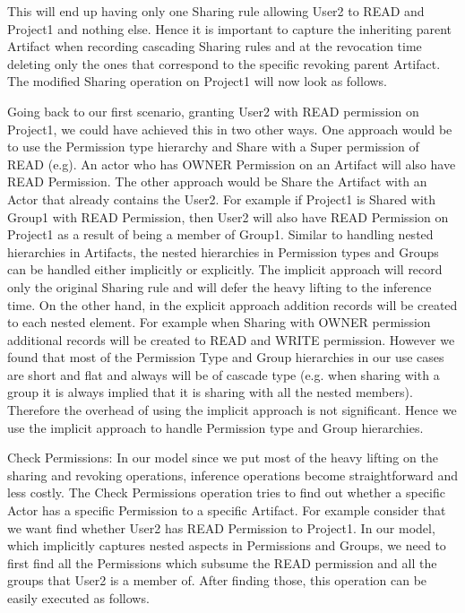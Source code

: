 \documentclass[sigconf]{acmart}
\begin{document}
This will end up having only one Sharing rule allowing User2 to READ and Project1 and nothing else. Hence it is important to capture the inheriting parent Artifact when recording cascading Sharing rules and at the revocation time deleting only the ones that correspond to the specific revoking parent Artifact. The modified Sharing operation on Project1 will now look as follows.

Going back to our first scenario, granting User2 with READ permission on Project1, we could have achieved this in two other ways. One approach would be to use the Permission type hierarchy and Share with a Super permission of READ (e.g). An actor who has OWNER Permission on an Artifact will also have READ Permission. The other approach would be Share the Artifact with an Actor that already contains the User2. For example if Project1 is Shared with Group1 with READ Permission, then User2 will also have READ Permission on Project1 as a result of being a member of Group1. Similar to handling nested hierarchies in Artifacts, the nested hierarchies in Permission types and Groups can be handled either implicitly or explicitly. The implicit approach will record only the original Sharing  rule and will defer the heavy lifting to the inference time. On the other hand, in the explicit approach addition records will be created to each nested element. For example when Sharing with OWNER permission additional records will be created to READ and WRITE permission. However we found that most of the Permission Type and Group hierarchies in our use cases are short and flat and always will be of cascade type (e.g. when sharing with a group it is always implied that it is sharing with all the nested members). Therefore the overhead of using the implicit approach is not significant. Hence we use the implicit approach to handle Permission type and Group hierarchies.

Check Permissions: In our model since we put most of the heavy lifting on the sharing and revoking operations, inference operations become straightforward and less costly. The Check Permissions operation tries to find out whether a specific Actor has a specific Permission to a specific Artifact. For example consider that we want find whether User2 has READ Permission to Project1. In our model, which implicitly captures nested aspects in Permissions and Groups, we need to first find all the Permissions which subsume the READ permission and all the groups that User2 is a member of. After finding those, this operation can be easily executed as follows.
\end{document}
